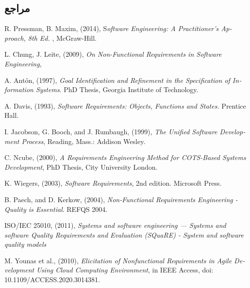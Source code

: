 {\begin{enumerate}[a)]
\begin{center}
\end{center}
\end{enumerate}
	

\subsection*{مراجع}

\begin{latin}
	\begingroup
	\renewcommand{\section}[2]{}%
	
\begin{thebibliography}{9}

	R. Pressman,   B. Maxim, (2014),
	S\textit{oftware Engineering: A Practitioner’s Approach, 8th Ed. },
	McGraw-Hill.

	
	
	L. Chung,  J. Leite, (2009),
	\textit{On Non-Functional Requirements in Software Engineering},
	
	
	A. Antón, (1997),
	\textit{Goal Identification and Refinement in
	the Specification of Information Systems}. PhD Thesis,
	Georgia Institute of Technology.
	
	A. Davis, (1993), \textit{Software Requirements: Objects, Functions
	and States.} Prentice Hall.

	I. Jacobson, G. Booch, and J. Rumbaugh, (1999), \textit{The
	Unified Software Development Process}, Reading,
	Mass.: Addison Wesley.
	
	C. Ncube, (2000), \textit{A Requirements Engineering Method
	for COTS-Based Systems Development}, PhD Thesis,
	City University London.
	
	
	K. Wiegers, (2003), \textit{Software Requirements}, 2nd edition.
	Microsoft Press.
	
	B. Paech, and D. Kerkow,  (2004), \textit{Non-Functional Requirements Engineering - Quality is Essential}.
	REFQS 2004.


	ISO/IEC 25010, (2011),\textit{ Systems and software engineering — Systems and software Quality Requirements and Evaluation (SQuaRE) - System and software quality models}
	
	M. Younas et al., (2010), \textit{Elicitation of Nonfunctional Requirements in Agile Development Using Cloud Computing Environment}, in IEEE Access, doi: 10.1109/ACCESS.2020.3014381.
	

\end{thebibliography}
\end{latin}}
